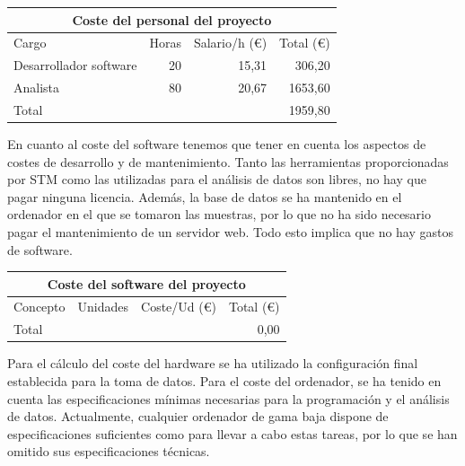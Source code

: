 \documentclass[spanish]{template/minim}
\begin{document}
\begin{table}[H]
    \centering
    \begin{tabularx}{\textwidth}{Xrrr}
      \toprule
      \multicolumn{4}{c}{Coste del personal del proyecto} \\
      \midrule
      Cargo & Horas & Salario/h (\euro{}) & Total (\euro{}) \\
      \midrule
      Desarrollador software & 20 & 15,31 & 306,20 \\
      Analista & 80 & 20,67 & 1653,60 \\
      \midrule
      Total & & & 1959,80\\
      \bottomrule
    \end{tabularx}
\end{table}


En cuanto al coste del software tenemos que tener en cuenta los aspectos de costes de desarrollo y de mantenimiento. Tanto las herramientas proporcionadas por STM como las utilizadas para el análisis de datos son libres, no hay que pagar ninguna licencia. Además, la base de datos se ha mantenido en el ordenador en el que se tomaron las muestras, por lo que no ha sido necesario pagar el mantenimiento de un servidor web. Todo esto implica que no hay gastos de software.\\


\begin{table}[H]
    \centering
    \begin{tabularx}{\textwidth}{Xrrr}
      \toprule
      \multicolumn{4}{c}{Coste del software del proyecto} \\
      \midrule
      Concepto & Unidades & Coste/Ud (\euro{}) & Total (\euro{}) \\
      \midrule
      Total & & & 0,00\\
      \bottomrule
    \end{tabularx}
\end{table}


Para el cálculo del coste del hardware se ha utilizado la configuración final establecida para la toma de datos. Para el coste del ordenador, se ha tenido en cuenta las especificaciones mínimas necesarias para la programación y el análisis de datos. Actualmente, cualquier ordenador de gama baja dispone de especificaciones suficientes como para llevar a cabo estas tareas, por lo que se han omitido sus especificaciones técnicas.\\
\end{document}
